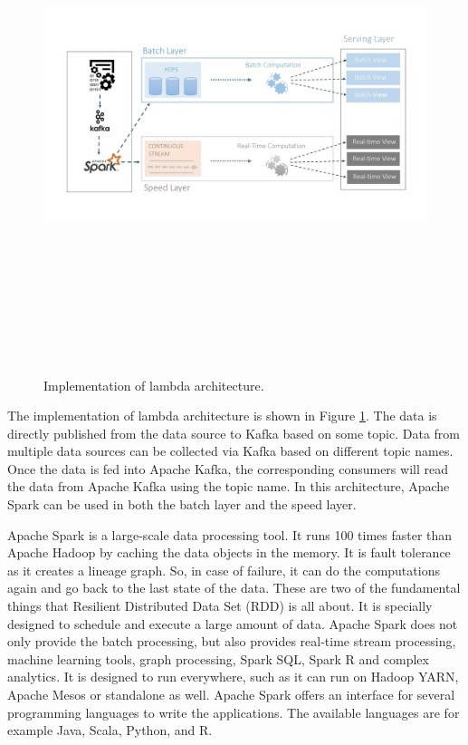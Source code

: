 \begin{figure}[htpb]
	\centering
	\includegraphics[width=17cm,height=15cm,keepaspectratio=true]{images/imp_lambda_arc}
	\caption{
		Implementation of lambda architecture.
	}
	\label{fig:impl_lambda_arc}
\end{figure}


The implementation of lambda architecture is shown in Figure \ref{fig:impl_lambda_arc}. The data is directly published from the data source to Kafka based on some topic. Data from multiple data sources can be collected via Kafka based on different topic names. Once the data is fed into Apache Kafka, the corresponding consumers will read the data from Apache Kafka using the topic name. In this architecture, Apache Spark can be used in both the batch layer and the speed layer. 

Apache Spark is a large-scale data processing tool. It runs 100 times faster than Apache Hadoop by caching the data objects in the memory. It is fault tolerance as it creates a lineage graph. So, in case of failure, it can do the computations again and go back to the last state of the data. These are two of the fundamental things that Resilient Distributed Data Set (RDD) is all about. It is specially designed to schedule and execute a large amount of data. Apache Spark does not only provide the batch processing, but also provides real-time stream processing, machine learning tools, graph processing, Spark SQL, Spark R and complex analytics. It is designed to run everywhere, such as it can run on Hadoop YARN, Apache Mesos or standalone as well. Apache Spark offers an interface for several programming languages to write the applications. The available languages are for example Java, Scala, Python, and R.


